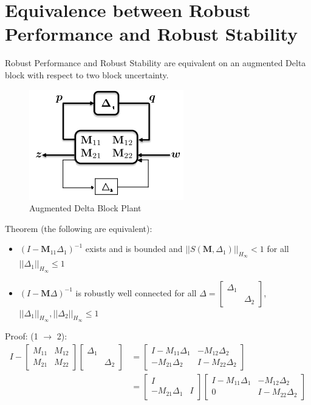 \documentclass{article}[12pt]
\newcommand{\norm}[1]{\left|\left|#1\right|\right|}
\begin{document}
\section{Equivalence between Robust Performance and Robust Stability}
Robust Performance and Robust Stability are equivalent on an augmented Delta block with respect to two block uncertainty.
\begin{figure} [H]
    \centering
    \includegraphics[scale = .7]{figures/augdelta.png}
    \caption{Augmented Delta Block Plant}
    \label{fig:my_label}
\end{figure}
Theorem (the following are equivalent):\\
\begin{itemize}
    \item $(I - \textbf{M}_{11}\Delta_1)^{-1}$ exists and is bounded and $\norm{S(\textbf{M},\Delta_1)}_{H_{\infty}} < 1$ for all $\norm{\Delta_1}_{H_{\infty}}\leq 1$
    \item $(I - \textbf{M}\Delta)^{-1}$ is robustly well connected for all $\Delta = \begin{bmatrix}\Delta_1& \\&\Delta_2\end{bmatrix}$, $\norm{\Delta_1}_{H_{\infty}}, \norm{\Delta_2}_{H_{\infty}} \leq 1$
\end{itemize}
Proof: (1 $\xrightarrow{}$ 2):\\
\begin{align*}
    I- \begin{bmatrix}M_{11}&M_{12}\\M_{21}&M_{22}\end{bmatrix}\begin{bmatrix}\Delta_1& \\&\Delta_2\end{bmatrix} &= \begin{bmatrix}I-M_{11}\Delta_1 & -M_{12}\Delta_2 \\ -M_{21}\Delta_2 & I-M_{22}\Delta_2 \end{bmatrix}\\
    &= \begin{bmatrix}I&\\ -M_{21}\Delta_1&I \end{bmatrix}\begin{bmatrix}I-M_{11}\Delta_1 & -M_{12}\Delta_2 \\ 0 & I-M_{22}\Delta_2 \end{bmatrix}
\end{align*}
\end{document}
